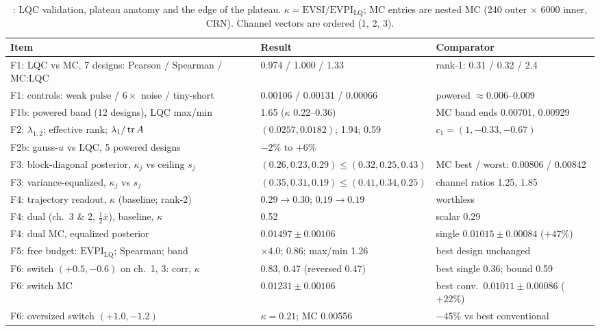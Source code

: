 \begin{table}[htbp]
\centering\footnotesize
\caption{: LQC validation, plateau anatomy and the edge of the plateau. $\kappa = \mathrm{EVSI}/\mathrm{EVPI}_{\mathrm{LQ}}$; MC entries are nested MC (240 outer $\times$ 6000 inner, CRN). Channel vectors are ordered (1, 2, 3).}
\label{voi:tab:lqc}
\begin{tabularx}{\textwidth}{Xll}
\toprule
Item & Result & Comparator \\
\midrule
F1: LQC vs MC, 7 designs: Pearson / Spearman / MC:LQC & 0.974 / 1.000 / 1.33 & rank-1: 0.31 / 0.32 / 2.4 \\
F1: controls: weak pulse / $6\times$ noise / tiny-short & 0.00106 / 0.00131 / 0.00066 & powered $\approx 0.006$--$0.009$ \\
F1b: powered band (12 designs), LQC max/min & 1.65 ($\kappa$ 0.22--0.36) & MC band ends 0.00701, 0.00929 \\
F2: $\lambda_{1,2}$; effective rank; $\lambda_1/\operatorname{tr} A$ & $(0.0257, 0.0182)$; 1.94; 0.59 & $c_1 = (1, -0.33, -0.67)$ \\
F2b: gauss-$u$ vs LQC, 5 powered designs & $-2\%$ to $+6\%$ & \\
F3: block-diagonal posterior, $\kappa_j$ vs ceiling $s_j$ & $(0.26, 0.23, 0.29) \le (0.32, 0.25, 0.43)$ & MC best / worst: 0.00806 / 0.00842 \\
F3: variance-equalized, $\kappa_j$ vs $s_j$ & $(0.35, 0.31, 0.19) \le (0.41, 0.34, 0.25)$ & channel ratios 1.25, 1.85 \\
F4: trajectory readout, $\kappa$ (baseline; rank-2) & $0.29 \to 0.30$; $0.19 \to 0.19$ & worthless \\
F4: dual (ch.\ 3 \& 2, $\tfrac12\bar x$), baseline, $\kappa$ & 0.52 & scalar 0.29 \\
F4: dual MC, equalized posterior & $0.01497 \pm 0.00106$ & single $0.01015 \pm 0.00084$ ($+47\%$) \\
F5: free budget: $\mathrm{EVPI}_{\mathrm{LQ}}$; Spearman; band & $\times 4.0$; 0.86; max/min 1.26 & best design unchanged \\
F6: switch $(+0.5, -0.6)$ on ch.\ 1, 3: corr, $\kappa$ & 0.83, 0.47 (reversed 0.47) & best single 0.36; bound 0.59 \\
F6: switch MC & $0.01231 \pm 0.00106$ & best conv.\ $0.01011 \pm 0.00086$ ($+22\%$) \\
F6: oversized switch $(+1.0, -1.2)$ & $\kappa = 0.21$; MC 0.00556 & $-45\%$ vs best conventional \\
\bottomrule
\end{tabularx}
\end{table}

